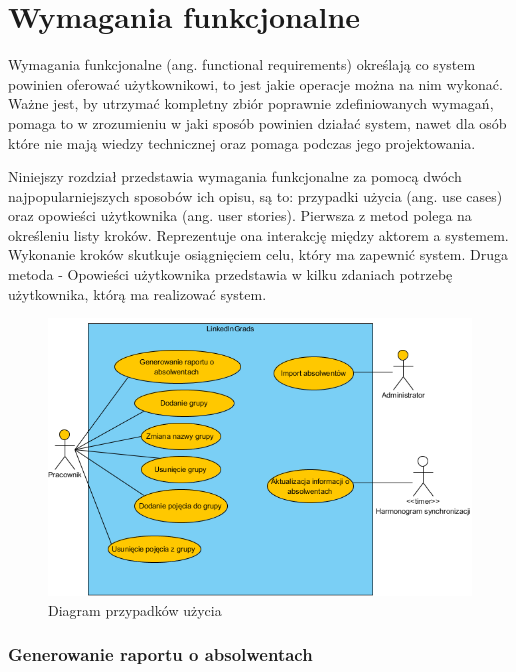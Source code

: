 \chapter{Wymagania funkcjonalne}
\label{Chapter3}

Wymagania funkcjonalne (ang. functional requirements) określają co system powinien oferować użytkownikowi, to jest jakie operacje można na nim wykonać. Ważne jest, by utrzymać kompletny zbiór poprawnie zdefiniowanych wymagań, pomaga to w zrozumieniu w jaki sposób powinien działać system, nawet dla osób które nie mają wiedzy technicznej oraz pomaga podczas jego projektowania.

Niniejszy rozdział przedstawia wymagania funkcjonalne za pomocą dwóch najpopularniejszych sposobów ich opisu, są to: przypadki użycia (ang. use cases)  oraz opowieści użytkownika (ang. user stories). Pierwsza z metod polega na określeniu listy kroków. Reprezentuje ona interakcję między aktorem a systemem. Wykonanie kroków skutkuje osiągnięciem celu, który ma zapewnić system. Druga metoda - Opowieści użytkownika przedstawia w kilku zdaniach potrzebę użytkownika, którą ma realizować system. 

\begin{figure}[th] 
\centering\includegraphics[width=15cm]{figures/image1}
\caption{Diagram przypadków użycia}\label{rys:use-case-diagram}
\end{figure}

\subsection{Generowanie raportu o absolwentach}

{}
{}{}
{}

